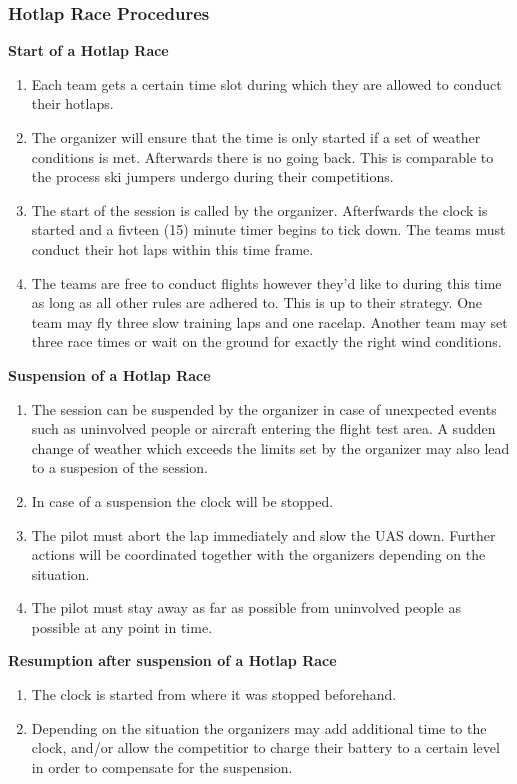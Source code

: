     \subsubsection{Hotlap Race Procedures}
    \textbf{Start of a Hotlap Race}
    \begin{enumerate}
      \item Each team gets a certain time slot during which they are allowed to conduct their hotlaps. 
      \item The organizer will ensure that the time is only started if a set of weather conditions is met. Afterwards there is no going back. This is comparable to the process ski jumpers undergo during their competitions.
      \item The start of the session is called by the organizer. Afterfwards the clock is started and a fivteen (15) minute timer begins to tick down. The teams must conduct their hot laps within this time frame.
      \item The teams are free to conduct flights however they'd like to during this time as long as all other rules are adhered to. This is up to their strategy. One team may fly three slow training laps and one racelap. Another team may set three race times or wait on the ground for exactly the right wind conditions.
    \end{enumerate}
    \textbf{Suspension of a Hotlap Race}
    \begin{enumerate}[resume]
      \item The session can be suspended by the organizer in case of unexpected events such as uninvolved people or aircraft entering the flight test area. A sudden change of weather which exceeds the limits set by the organizer may also lead to a suspesion of the session. 
      \item In case of a suspension the clock will be stopped. 
      \item The pilot must abort the lap immediately and slow the UAS down. Further actions will be coordinated together with the organizers depending on the situation.
      \item The pilot must stay away as far as possible from uninvolved people as possible at any point in time. 
    \end{enumerate}

    \textbf{Resumption after suspension of a Hotlap Race}
    \begin{enumerate}[resume]
      \item The clock is started from where it was stopped beforehand.
      \item Depending on the situation the organizers may add additional time to the clock, and/or allow the competitior to charge their battery to a certain level in order to compensate for the suspension.
    \end{enumerate}

